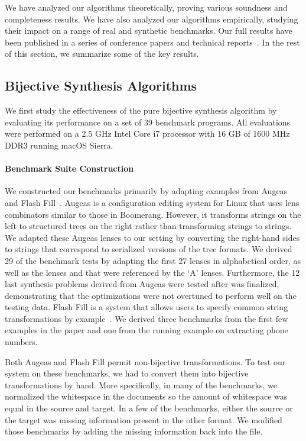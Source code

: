 \documentclass[12pt]{article}
\begin{document}
{We have analyzed our algorithms theoretically, proving various
soundness and completeness results.  We have also analyzed our
algorithms empirically, studying their impact on a range of real and
synthetic benchmarks.  Our full results have been published in a
series of conference papers and technical
reports~\cite{bijective-synthesis,quotient-synthesis,symmetric-synthesis}.  In the rest of this
section, we summarize some of the key results.

\subsection{Bijective Synthesis Algorithms}

We first study the effectiveness of the pure bijective synthesis
algorithm by evaluating its performance on a set of 39
benchmark programs.  
%
All evaluations were performed on a 2.5 GHz Intel Core i7 processor with 16 GB
of 1600 MHz DDR3 running macOS Sierra.

\paragraph*{Benchmark Suite Construction}
We constructed our benchmarks primarily by adapting examples from
Augeas~\cite{augeas} and 
Flash Fill~\cite{gulwani-popl-2014}.
%
Augeas is a configuration editing system for Linux that uses lens
combinators similar to those in Boomerang. However, it transforms
strings on the left to structured trees on the right rather than
transforming strings to strings.
We adapted these Augeas lenses to our setting by converting the
right-hand sides to strings that correspond to serialized versions
of the tree formats.  
We derived 29 of the benchmark tests by
adapting the first 27 lenses in alphabetical order, as well as the lenses
 and  that were referenced
by the `A' lenses.
Furthermore, the 12 last synthesis problems derived
from Augeas were tested after \Optician{} was
finalized, demonstrating that the optimizations were not
overtuned to perform well on the testing data.
%
Flash Fill is a system that allows users to specify common string
transformations by example~\cite{gulwani-popl-2014}.  
We derived three benchmarks from the first few examples in the
paper and one from the running example on
extracting phone numbers.

Both Augeas and Flash Fill permit non-bijective transformations.
To test our system on these benchmarks, we had to convert them into
bijective transformations by hand.  More specifically, in many of the
benchmarks, we normalized
the whitespace in the documents so the amount of whitespace was equal
in the source and target.  In a few of the benchmarks, either the
source or the target was missing information present in the other
format.  We modified those benchmarks by adding the missing
information back into the file. 

}
\end{document}
